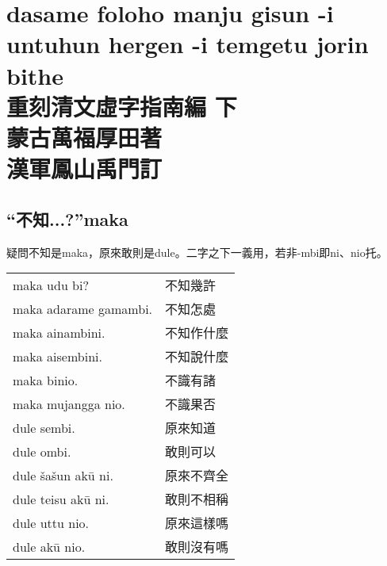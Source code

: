 \documentclass{article}
\begin{document}
\section{dasame foloho manju gisun -i untuhun hergen -i temgetu jorin bithe\\重刻清文虛字指南編 下\\\large{蒙古\;萬福厚田\;著\\
漢軍\;鳳山禹門\;訂}}

\subsection{“不知...?”maka}
\noindent 疑問不知是maka，原來敢則是dule。二字之下一義用，若非-mbi即ni、nio托。
\begin{center}
    \begin{tabularx}{\textwidth}{XX}
        maka udu bi? &不知幾許\\
        maka adarame gamambi. &不知怎處\\
        maka ainambini. & 不知作什麼\\
        maka aisembini. & 不知說什麼\\
        maka binio. & 不識有諸\\
        maka mujangga nio. &不識果否\\
        dule sembi. & 原來知道\\
        dule ombi. &敢則可以\\
        dule \v{s}a\v{s}un ak\={u} ni. & 原來不齊全\\
        dule teisu ak\={u} ni. & 敢則不相稱\\
        dule uttu nio. & 原來這樣嗎\\
        dule ak\={u} nio. & 敢則沒有嗎
    \end{tabularx}
\end{center}
\end{document}
